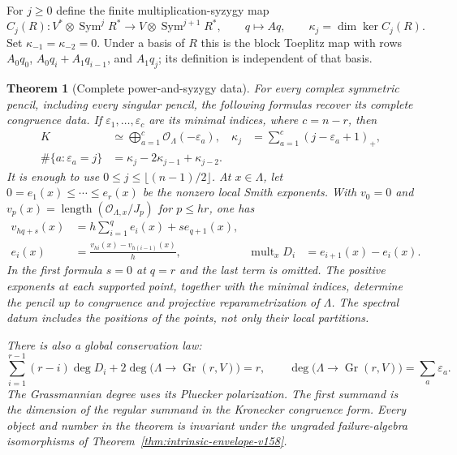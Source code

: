\documentclass[11pt,reqno]{amsart}
\numberwithin{equation}{section}
\newtheorem{theorem}{Theorem}[section]
\theoremstyle{definition}\newtheorem{definition}[theorem]{Definition}
\theoremstyle{remark}\newtheorem{remark}[theorem]{Remark}
\newcommand{\OO}{\mathcal O}\newcommand{\II}{\mathcal I}
\DeclareMathOperator{\Sym}{Sym}\DeclareMathOperator{\Gr}{Gr}
\DeclareMathOperator{\length}{length}
\begin{document}
For $j\geq0$ define the finite multiplication-syzygy map
\begin{equation}\label{eq:toeplitz-map-v158}
 C_j(R):V^*\otimes\Sym^jR^*\longrightarrow
                         V\otimes\Sym^{j+1}R^*,\qquad q\longmapsto A q,
 \qquad\kappa_j=\dim\ker C_j(R).
\end{equation}
Set $\kappa_{-1}=\kappa_{-2}=0$. Under a basis of $R$ this is the block
Toeplitz map with rows $A_0q_0$, $A_0q_i+A_1q_{i-1}$, and $A_1q_j$;
its definition is independent of that basis.

\begin{theorem}[Complete power-and-syzygy data]
\label{thm:singular-complete-data-v158}
For every complex symmetric pencil, including every singular pencil,
the following formulas recover its complete congruence data.
If $\varepsilon_1,\ldots,\varepsilon_c$ are its minimal indices,
where $c=n-r$, then
\begin{align}
 K&\simeq\bigoplus_{a=1}^c\OO_\Lambda(-\varepsilon_a),
 &\kappa_j&=\sum_{a=1}^c(j-\varepsilon_a+1)_+,
                       \label{eq:kernel-splitting-v158}\\
 \#\{a:\varepsilon_a=j\}
   &=\kappa_j-2\kappa_{j-1}+\kappa_{j-2}.
                       \label{eq:minimal-differences-v158}
\end{align}
It is enough to use $0\leq j\leq\lfloor(n-1)/2\rfloor$.
At $x\in\Lambda$, let $0=e_1(x)\leq\cdots\leq e_r(x)$ be the
nonzero local Smith exponents. With $v_0=0$ and
$v_p(x)=\length(\OO_{\Lambda,x}/J_p)$ for $p\leq hr$, one has
\begin{align}
 v_{hq+s}(x)&=h\sum_{i=1}^{q}e_i(x)+s e_{q+1}(x),
                         \label{eq:singular-valuations-v158}\\
 e_i(x)&=\frac{v_{hi}(x)-v_{h(i-1)}(x)}h,
 &\operatorname{mult}_xD_i&=e_{i+1}(x)-e_i(x).
                         \label{eq:singular-contacts-v158}
\end{align}
In the first formula $s=0$ at $q=r$ and the last term is omitted.
The positive exponents at each supported point, together with the
minimal indices, determine the pencil up to congruence and projective
reparametrization of $\Lambda$. The spectral datum includes the
positions of the points, not only their local partitions.

There is also a global conservation law:
\begin{equation}\label{eq:conservation-v158}
 \sum_{i=1}^{r-1}(r-i)\deg D_i
       +2\deg\bigl(\Lambda\longrightarrow\Gr(r,V)\bigr)
       =r,\qquad
 \deg\bigl(\Lambda\longrightarrow\Gr(r,V)\bigr)
       =\sum_a\varepsilon_a.
\end{equation}
The Grassmannian degree uses its Pluecker polarization. The first
summand is the dimension of the regular summand in the Kronecker
congruence form. Every object and number in the theorem is invariant
under the ungraded failure-algebra isomorphisms of
Theorem~\ref{thm:intrinsic-envelope-v158}.
\end{theorem}
\end{document}
